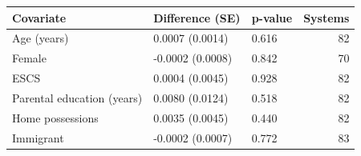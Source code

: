 \begin{tabular}{lllr}
\toprule
Covariate & Difference (SE) & p-value & Systems \\
\midrule
Age (years) & 0.0007 (0.0014) & 0.616 & 82 \\
Female & -0.0002 (0.0008) & 0.842 & 70 \\
ESCS & 0.0004 (0.0045) & 0.928 & 82 \\
Parental education (years) & 0.0080 (0.0124) & 0.518 & 82 \\
Home possessions & 0.0035 (0.0045) & 0.440 & 82 \\
Immigrant & -0.0002 (0.0007) & 0.772 & 83 \\
\bottomrule
\end{tabular}

